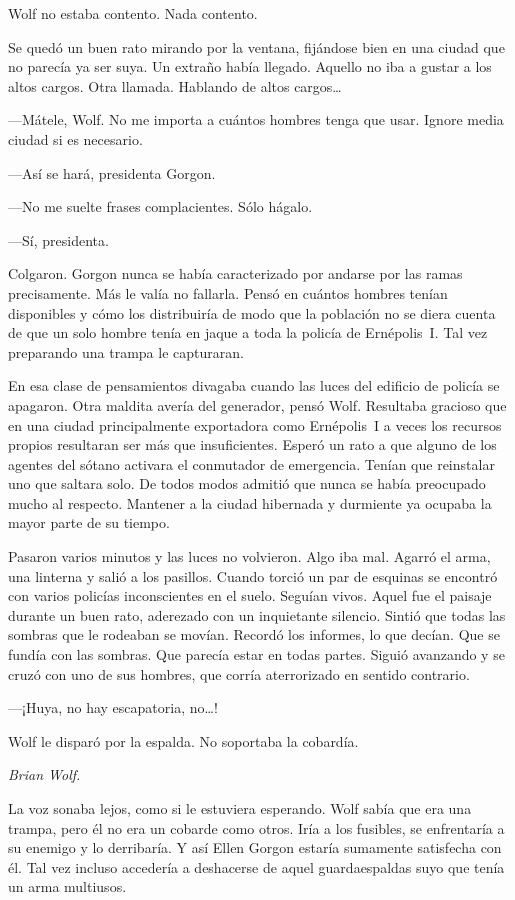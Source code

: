 Wolf no estaba contento. Nada contento.

Se quedó un buen rato mirando por la ventana, fijándose bien en una ciudad que no parecía ya ser suya. Un extraño había llegado. Aquello no iba a gustar a los altos cargos. Otra llamada. Hablando de altos cargos\dots{}

---Mátele, Wolf. No me importa a cuántos hombres tenga que usar. Ignore media ciudad si es necesario.

---Así se hará, presidenta Gorgon.

---No me suelte frases complacientes. Sólo hágalo.

---Sí, presidenta.

Colgaron. Gorgon nunca se había caracterizado por andarse por las ramas precisamente. Más le valía no fallarla. Pensó en cuántos hombres tenían disponibles y cómo los distribuiría de modo que la población no se diera cuenta de que un solo hombre tenía en jaque a toda la policía de Ernépolis~I. Tal vez preparando una trampa le capturaran.

En esa clase de pensamientos divagaba cuando las luces del edificio de policía se apagaron. Otra maldita avería del generador, pensó Wolf. Resultaba gracioso que en una ciudad principalmente exportadora como Ernépolis~I a veces los recursos propios resultaran ser más que insuficientes. Esperó un rato a que alguno de los agentes del sótano activara el conmutador de emergencia. Tenían que reinstalar uno que saltara solo. De todos modos admitió que nunca se había preocupado mucho al respecto. Mantener a la ciudad hibernada y durmiente ya ocupaba la mayor parte de su tiempo.

Pasaron varios minutos y las luces no volvieron. Algo iba mal. Agarró el arma, una linterna y salió a los pasillos. Cuando torció un par de esquinas se encontró con varios policías inconscientes en el suelo. Seguían vivos. Aquel fue el paisaje durante un buen rato, aderezado con un inquietante silencio. Sintió que todas las sombras que le rodeaban se movían. Recordó los informes, lo que decían. Que se fundía con las sombras. Que parecía estar en todas partes. Siguió avanzando y se cruzó con uno de sus hombres, que corría aterrorizado en sentido contrario.

---¡Huya, no hay escapatoria, no\dots{}!

Wolf le disparó por la espalda. No soportaba la cobardía.

\emph{Brian Wolf.}

La voz sonaba lejos, como si le estuviera esperando. Wolf sabía que era una trampa, pero él no era un cobarde como otros. Iría a los fusibles, se enfrentaría a su enemigo y lo derribaría. Y así Ellen Gorgon estaría sumamente satisfecha con él. Tal vez incluso accedería a deshacerse de aquel guardaespaldas suyo que tenía un arma multiusos.

